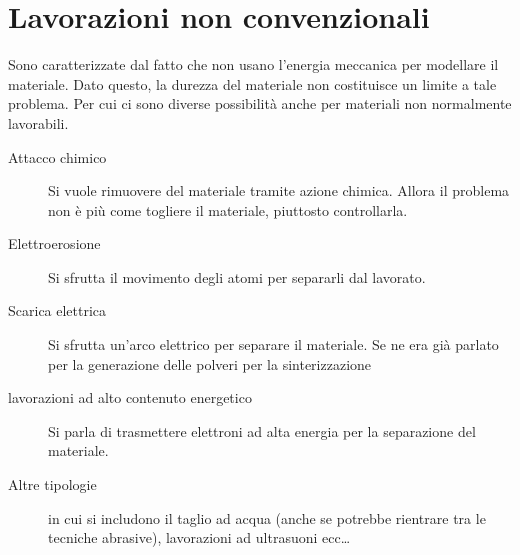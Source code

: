 \chapter{Lavorazioni non convenzionali}\label{chp:NonConvenzionale}
Sono caratterizzate dal fatto che non usano l'energia meccanica per modellare il materiale.
Dato questo, la durezza del materiale non costituisce un limite a tale problema. Per cui ci sono diverse possibilità anche per materiali non normalmente lavorabili.


\begin{description}
\item[Attacco chimico] Si vuole rimuovere del materiale tramite azione chimica. Allora il problema non è più come togliere il materiale, piuttosto controllarla.
\item[Elettroerosione] Si sfrutta il movimento degli atomi per separarli dal lavorato.
\item[Scarica elettrica] Si sfrutta un'arco elettrico per separare il materiale. Se ne era già parlato per la generazione delle polveri per la sinterizzazione
\item[lavorazioni ad alto contenuto energetico] Si parla di trasmettere elettroni ad alta energia per la separazione del materiale.
\item[Altre tipologie] in cui si includono il taglio ad acqua (anche se potrebbe rientrare tra le tecniche abrasive), lavorazioni ad ultrasuoni ecc\dots
\end{description}